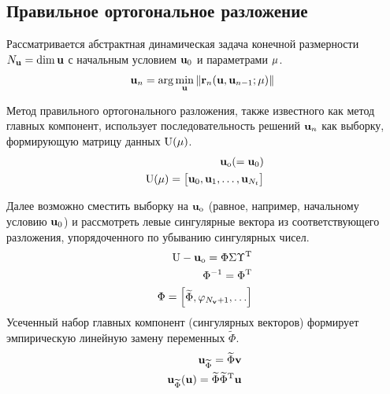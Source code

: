 \subsection{Правильное ортогональное разложение}

Рассматривается абстрактная динамическая задача конечной размерности $N_{\mathbf{u}} = \dim \mathbf{u}$ с начальным условием $\mathbf{u}_0$ и параметрами $\mathbf{\mu}$.
\begin{equation}
    \mathbf{u}_n = \arg \min_{\mathbf{u}} \left\| \mathbf{r}_n(\mathbf{u},\mathbf{u}_{n-1};\mathbf{\mu}) \right\|_{~}
\end{equation}

Метод правильного ортогонального разложения, также известного как метод главных компонент, использует последовательность решений $\mathbf{u}_n$ как выборку, формирующую матрицу данных $\matr{U} (\param)$.
\begin{align}
    \unk_\text{o} (= \unk_0) \\
    \matr{U} (\param) =
    \begin{bmatrix}
        \unk_0, \unk_1, \dots, \unk_{N_t}
    \end{bmatrix}
\end{align}

Далее возможно сместить выборку на $\mathbf{u}_\text{o}$ (равное, например, начальному условию $\mathbf{u}_0$) и рассмотреть левые сингулярные вектора из соответствующего разложения, упорядоченного по убыванию сингулярных чисел.
\begin{align}
    \matr{u} - \unk_\text{o} = \Phi \Sigma \transpose{\Upsilon} \\
    \Phi^{-1} = \transpose{\Phi} \\
    \Phi = \begin{bmatrix}
        \widetilde{\Phi}, \pc[N_\vunk + 1], \dots
    \end{bmatrix}
\end{align}
Усеченный набор главных компонент (сингулярных векторов) формирует эмпирическую линейную замену переменных $\widetilde{\Phi}$.
\begin{align}
    \unk_{\widetilde{\Phi}} = \widetilde{\Phi} \vunk \\
    \unk_{\widetilde{\Phi}}(\unk) = \widetilde{\Phi} \transpose{\widetilde{\Phi}} \unk
\end{align}

